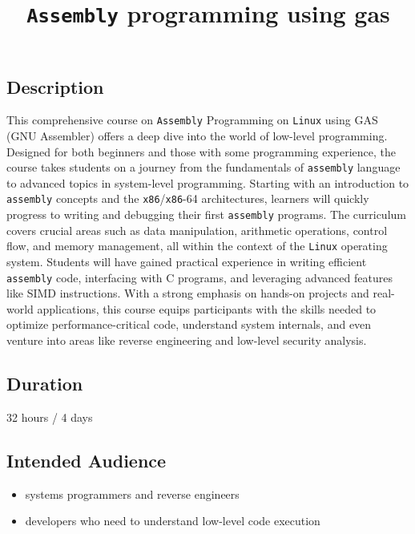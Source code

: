 \documentclass[
]{article}
\title{\texttt{Assembly} programming using gas}
\author{}
\date{}
\providecommand{\tightlist}{%
  \setlength{\itemsep}{0pt}\setlength{\parskip}{0pt}}
\begin{document}
\maketitle

\subsection{Description}\label{description}

This comprehensive course on \texttt{Assembly} Programming on
\texttt{Linux} using GAS (GNU Assembler) offers a deep dive into the
world of low-level programming. Designed for both beginners and those
with some programming experience, the course takes students on a journey
from the fundamentals of \texttt{assembly} language to advanced topics
in system-level programming. Starting with an introduction to
\texttt{assembly} concepts and the \texttt{x86}/\texttt{x86}-64
architectures, learners will quickly progress to writing and debugging
their first \texttt{assembly} programs. The curriculum covers crucial
areas such as data manipulation, arithmetic operations, control flow,
and memory management, all within the context of the \texttt{Linux}
operating system. Students will have gained practical experience in
writing efficient \texttt{assembly} code, interfacing with C programs,
and leveraging advanced features like SIMD instructions. With a strong
emphasis on hands-on projects and real-world applications, this course
equips participants with the skills needed to optimize
performance-critical code, understand system internals, and even venture
into areas like reverse engineering and low-level security analysis.

\subsection{Duration}\label{duration}

32 hours / 4 days

\subsection{Intended Audience}\label{intended-audience}

\begin{itemize}
\tightlist
\item
  systems programmers and reverse engineers
\item
  developers who need to understand low-level code execution
\end{itemize}
\end{document}
